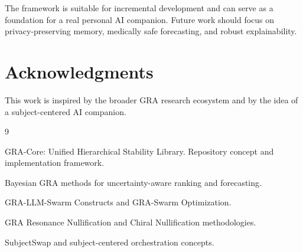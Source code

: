 \documentclass[11pt,a4paper]{article}
\begin{document}
The framework is suitable for incremental development and can serve as a foundation for a real personal AI companion. Future work should focus on privacy-preserving memory, medically safe forecasting, and robust explainability.

\section*{Acknowledgments}

This work is inspired by the broader GRA research ecosystem and by the idea of a subject-centered AI companion.

\begin{thebibliography}{9}

GRA-Core: Unified Hierarchical Stability Library. Repository concept and implementation framework.

Bayesian GRA methods for uncertainty-aware ranking and forecasting.

GRA-LLM-Swarm Constructs and GRA-Swarm Optimization.

GRA Resonance Nullification and Chiral Nullification methodologies.

SubjectSwap and subject-centered orchestration concepts.

\end{thebibliography}
\end{document}

